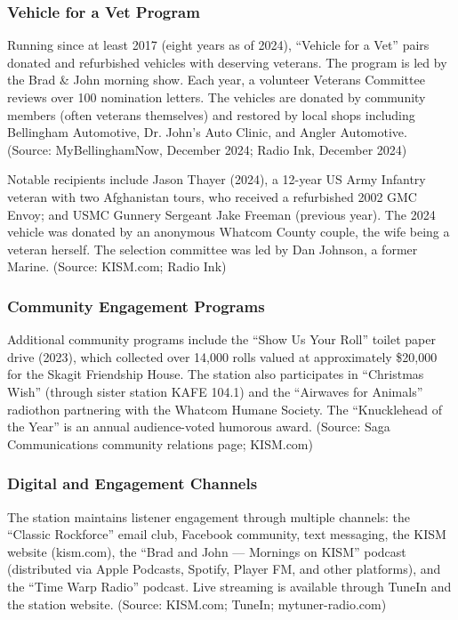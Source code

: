 \documentclass[11pt,letterpaper]{article}
\begin{document}
\subsubsection{Vehicle for a Vet Program}

Running since at least 2017 (eight years as of 2024), ``Vehicle for a Vet'' pairs donated and refurbished vehicles with deserving veterans. The program is led by the Brad \& John morning show. Each year, a volunteer Veterans Committee reviews over 100 nomination letters. The vehicles are donated by community members (often veterans themselves) and restored by local shops including Bellingham Automotive, Dr. John's Auto Clinic, and Angler Automotive. (Source: MyBellinghamNow, December 2024; Radio Ink, December 2024)

Notable recipients include Jason Thayer (2024), a 12-year US Army Infantry veteran with two Afghanistan tours, who received a refurbished 2002 GMC Envoy; and USMC Gunnery Sergeant Jake Freeman (previous year). The 2024 vehicle was donated by an anonymous Whatcom County couple, the wife being a veteran herself. The selection committee was led by Dan Johnson, a former Marine. (Source: KISM.com; Radio Ink)

\subsubsection{Community Engagement Programs}

Additional community programs include the ``Show Us Your Roll'' toilet paper drive (2023), which collected over 14,000 rolls valued at approximately \$20,000 for the Skagit Friendship House. The station also participates in ``Christmas Wish'' (through sister station KAFE 104.1) and the ``Airwaves for Animals'' radiothon partnering with the Whatcom Humane Society. The ``Knucklehead of the Year'' is an annual audience-voted humorous award. (Source: Saga Communications community relations page; KISM.com)

\subsubsection{Digital and Engagement Channels}

The station maintains listener engagement through multiple channels: the ``Classic Rockforce'' email club, Facebook community, text messaging, the KISM website (kism.com), the ``Brad and John --- Mornings on KISM'' podcast (distributed via Apple Podcasts, Spotify, Player FM, and other platforms), and the ``Time Warp Radio'' podcast. Live streaming is available through TuneIn and the station website. (Source: KISM.com; TuneIn; mytuner-radio.com)
\end{document}
